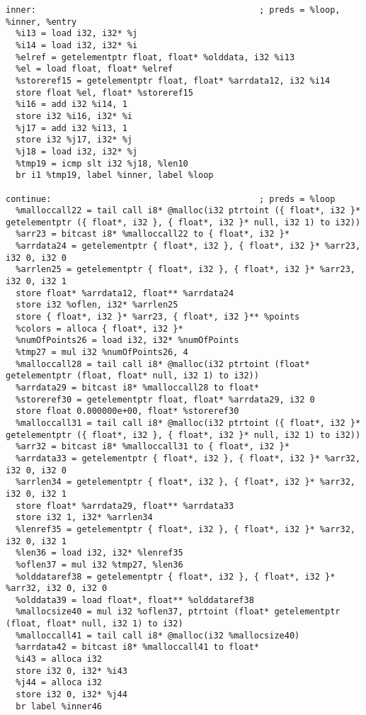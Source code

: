 \documentclass[main.tex]{subfiles}
\begin{document}
{\begin{lstlisting}
inner:                                            ; preds = %loop, %inner, %entry
  %i13 = load i32, i32* %j
  %i14 = load i32, i32* %i
  %elref = getelementptr float, float* %olddata, i32 %i13
  %el = load float, float* %elref
  %storeref15 = getelementptr float, float* %arrdata12, i32 %i14
  store float %el, float* %storeref15
  %i16 = add i32 %i14, 1
  store i32 %i16, i32* %i
  %j17 = add i32 %i13, 1
  store i32 %j17, i32* %j
  %j18 = load i32, i32* %j
  %tmp19 = icmp slt i32 %j18, %len10
  br i1 %tmp19, label %inner, label %loop

continue:                                         ; preds = %loop
  %malloccall22 = tail call i8* @malloc(i32 ptrtoint ({ float*, i32 }* getelementptr ({ float*, i32 }, { float*, i32 }* null, i32 1) to i32))
  %arr23 = bitcast i8* %malloccall22 to { float*, i32 }*
  %arrdata24 = getelementptr { float*, i32 }, { float*, i32 }* %arr23, i32 0, i32 0
  %arrlen25 = getelementptr { float*, i32 }, { float*, i32 }* %arr23, i32 0, i32 1
  store float* %arrdata12, float** %arrdata24
  store i32 %oflen, i32* %arrlen25
  store { float*, i32 }* %arr23, { float*, i32 }** %points
  %colors = alloca { float*, i32 }*
  %numOfPoints26 = load i32, i32* %numOfPoints
  %tmp27 = mul i32 %numOfPoints26, 4
  %malloccall28 = tail call i8* @malloc(i32 ptrtoint (float* getelementptr (float, float* null, i32 1) to i32))
  %arrdata29 = bitcast i8* %malloccall28 to float*
  %storeref30 = getelementptr float, float* %arrdata29, i32 0
  store float 0.000000e+00, float* %storeref30
  %malloccall31 = tail call i8* @malloc(i32 ptrtoint ({ float*, i32 }* getelementptr ({ float*, i32 }, { float*, i32 }* null, i32 1) to i32))
  %arr32 = bitcast i8* %malloccall31 to { float*, i32 }*
  %arrdata33 = getelementptr { float*, i32 }, { float*, i32 }* %arr32, i32 0, i32 0
  %arrlen34 = getelementptr { float*, i32 }, { float*, i32 }* %arr32, i32 0, i32 1
  store float* %arrdata29, float** %arrdata33
  store i32 1, i32* %arrlen34
  %lenref35 = getelementptr { float*, i32 }, { float*, i32 }* %arr32, i32 0, i32 1
  %len36 = load i32, i32* %lenref35
  %oflen37 = mul i32 %tmp27, %len36
  %olddataref38 = getelementptr { float*, i32 }, { float*, i32 }* %arr32, i32 0, i32 0
  %olddata39 = load float*, float** %olddataref38
  %mallocsize40 = mul i32 %oflen37, ptrtoint (float* getelementptr (float, float* null, i32 1) to i32)
  %malloccall41 = tail call i8* @malloc(i32 %mallocsize40)
  %arrdata42 = bitcast i8* %malloccall41 to float*
  %i43 = alloca i32
  store i32 0, i32* %i43
  %j44 = alloca i32
  store i32 0, i32* %j44
  br label %inner46


\end{lstlisting}}
\end{document}
